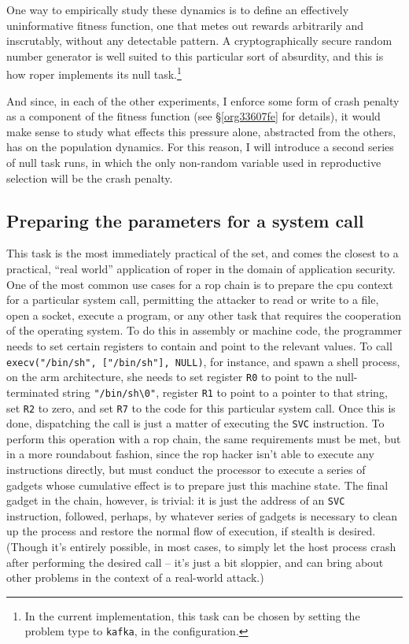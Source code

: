 \documentclass[12pt,glossary]{dalthesis}
\begin{document}
One way to empirically study these dynamics is to define an
effectively uninformative fitness function, one that metes out rewards arbitrarily
and inscrutably, without any detectable pattern. A cryptographically secure
random number generator is well suited to this particular sort of absurdity, and
this is how \gls{roper} implements its null task.\footnote{In the current implementation, this task can be chosen by setting the 
  problem type to \texttt{kafka}, in the configuration.} 

And since, in each of the other experiments, I enforce some form of crash penalty
as a component of the fitness function (see \S \ref{org33607fe} for details),
it would make sense to study what effects this pressure alone, abstracted from
the others, has on the population dynamics. For this reason, I will introduce
a second series of null task runs, in which the only non-random variable used
in reproductive selection will be the crash penalty. 

\subsection{Preparing the parameters for a system call}
\label{sec:orgc78cc07}
\label{org71f4931}

This task is the most immediately practical of the set, and comes the closest to
a practical, ``real world'' application of \gls{roper} in the domain of application
security. One of the most common use cases for a \gls{rop} chain is to prepare
the \gls{cpu} context for a particular system call, permitting the attacker to
read or write to a file, open a socket, execute a program, or any other task
that requires the cooperation of the operating system. To do this in assembly
or machine code, the programmer needs to set certain registers to contain and
point to the relevant values. To call \texttt{execv("/bin/sh", ["/bin/sh"], NULL)}, 
for instance, and spawn a shell process, on the \gls{arm} architecture, she needs
to set register \texttt{R0} to point to the null-terminated string \texttt{"/bin/sh\textbackslash{}0"}, 
register \texttt{R1} to point to a pointer to that string, set \texttt{R2} to zero, and
set \texttt{R7} to the code for this particular system call. Once this is done, dispatching
the call is just a matter of executing the \texttt{SVC} instruction. To perform this
operation with a \gls{rop} chain, the same requirements must be met, but in a more
roundabout fashion, since the \gls{rop} hacker isn't able to execute any instructions
directly, but must conduct the processor to execute a series of gadgets whose
cumulative effect is to prepare just this machine state. The final gadget in the
chain, however, is trivial: it is just the address of an \texttt{SVC} instruction, followed,
perhaps, by whatever series of gadgets is necessary to clean up the process and 
restore the normal flow of execution, if stealth is desired. (Though it's entirely
possible, in most cases, to simply let the host process crash after performing the
desired call -- it's just a bit sloppier, and can bring about other problems in the
context of a real-world attack.)
\end{document}
